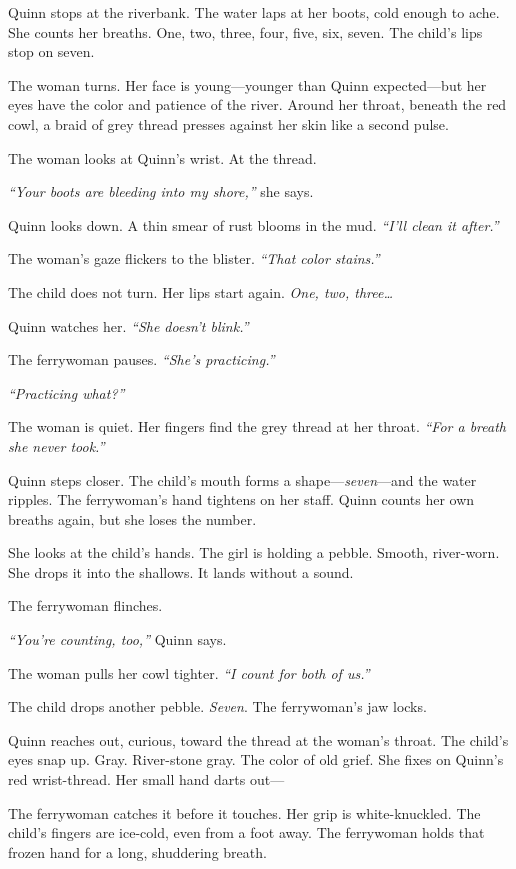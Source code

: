 \documentclass[11pt]{book}
\begin{document}
Quinn stops at the riverbank. The water laps at her boots, cold enough to ache. She counts her breaths. One, two, three, four, five, six, seven. The child's lips stop on seven.

The woman turns. Her face is young---younger than Quinn expected---but her eyes have the color and patience of the river. Around her throat, beneath the red cowl, a braid of grey thread presses against her skin like a second pulse.

The woman looks at Quinn's wrist. At the thread.

\emph{``Your boots are bleeding into my shore,''} she says.

Quinn looks down. A thin smear of rust blooms in the mud. \emph{``I'll clean it after.''}

The woman's gaze flickers to the blister. \emph{``That color stains.''}

The child does not turn. Her lips start again. \emph{One, two, three\ldots}

Quinn watches her. \emph{``She doesn't blink.''}

The ferrywoman pauses. \emph{``She's practicing.''}

\emph{``Practicing what?''}

The woman is quiet. Her fingers find the grey thread at her throat. \emph{``For a breath she never took.''}

Quinn steps closer. The child's mouth forms a shape---\emph{seven}---and the water ripples. The ferrywoman's hand tightens on her staff. Quinn counts her own breaths again, but she loses the number.

She looks at the child's hands. The girl is holding a pebble. Smooth, river-worn. She drops it into the shallows. It lands without a sound.

The ferrywoman flinches.

\emph{``You're counting, too,''} Quinn says.

The woman pulls her cowl tighter. \emph{``I count for both of us.''}

The child drops another pebble. \emph{Seven}. The ferrywoman's jaw locks.

Quinn reaches out, curious, toward the thread at the woman's throat. The child's eyes snap up. Gray. River-stone gray. The color of old grief. She fixes on Quinn's red wrist-thread. Her small hand darts out---

The ferrywoman catches it before it touches. Her grip is white-knuckled. The child's fingers are ice-cold, even from a foot away. The ferrywoman holds that frozen hand for a long, shuddering breath.
\end{document}
